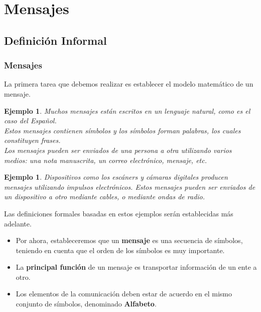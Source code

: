 \documentclass{beamer}
\newtheorem{ejemplo} [Ejemplo] {Ejemplo}
\begin{document}

\section{Mensajes}

\subsection{Definición Informal}

\begin{frame}  \frametitle{Mensajes}    \small
  La primera tarea que debemos realizar es establecer el modelo matemático de un mensaje. 
  
\begin{ejemplo}
Muchos mensajes están escritos en un lenguaje natural, como es el caso del Español.\\

Estos mensajes contienen símbolos y los símbolos forman palabras, los cuales constituyen frases.\\

\vspace{0,5cm}
Los mensajes pueden ser enviados de una persona a otra utilizando varios medios: una nota manuscrita, un correo electrónico, mensaje, etc. 
 
\end{ejemplo}
\end{frame}

\begin{frame}

\small

\begin{ejemplo}
Dispositivos como los escáners y cámaras digitales producen mensajes utilizando impulsos electrónicos. Estos mensajes pueden ser enviados de un dispositivo a otro mediante cables, o mediante ondas de radio.
\end{ejemplo}

Las definiciones formales basadas en estos ejemplos serán establecidas más adelante. 


\begin{itemize}
\item Por ahora, estableceremos que un \textbf{mensaje} es una secuencia de símbolos, teniendo en cuenta que el orden de los símbolos es muy importante. 

\item  La \textbf{principal función} de un mensaje es transportar información de un ente a otro. 

\item Los elementos de la comunicación deben estar de acuerdo en el mismo conjunto de símbolos, denominado \textbf{Alfabeto}.

\end{itemize}


\end{frame}
\end{document}
